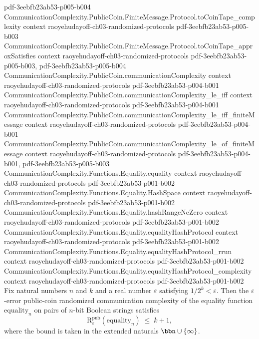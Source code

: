 \begin{theorem}
{    pdf-3eebfb23ab53-p005-b004}
\proofstep
  {CommunicationComplexity.PublicCoin.FiniteMessage.Protocol.toCoinTape_complexity}
  {context}
  {raoyehudayoff-ch03-randomized-protocols}
  {pdf-3eebfb23ab53-p005-b003}
\proofstep
  {CommunicationComplexity.PublicCoin.FiniteMessage.Protocol.toCoinTape_approxSatisfies}
  {context}
  {raoyehudayoff-ch03-randomized-protocols}
  {pdf-3eebfb23ab53-p005-b003,
    pdf-3eebfb23ab53-p005-b004}
\proofstep
  {CommunicationComplexity.PublicCoin.communicationComplexity}
  {context}
  {raoyehudayoff-ch03-randomized-protocols}
  {pdf-3eebfb23ab53-p004-b001}
\proofstep
  {CommunicationComplexity.PublicCoin.communicationComplexity_le_iff}
  {context}
  {raoyehudayoff-ch03-randomized-protocols}
  {pdf-3eebfb23ab53-p004-b001}
\proofstep
  {CommunicationComplexity.PublicCoin.communicationComplexity_le_iff_finiteMessage}
  {context}
  {raoyehudayoff-ch03-randomized-protocols}
  {pdf-3eebfb23ab53-p004-b001}
\proofstep
  {CommunicationComplexity.PublicCoin.communicationComplexity_le_of_finiteMessage}
  {context}
  {raoyehudayoff-ch03-randomized-protocols}
  {pdf-3eebfb23ab53-p004-b001,
    pdf-3eebfb23ab53-p005-b003}
\proofstep
  {CommunicationComplexity.Functions.Equality.equality}
  {context}
  {raoyehudayoff-ch03-randomized-protocols}
  {pdf-3eebfb23ab53-p001-b002}
\proofstep
  {CommunicationComplexity.Functions.Equality.HashSpace}
  {context}
  {raoyehudayoff-ch03-randomized-protocols}
  {pdf-3eebfb23ab53-p001-b002}
\proofstep
  {CommunicationComplexity.Functions.Equality.hashRangeNeZero}
  {context}
  {raoyehudayoff-ch03-randomized-protocols}
  {pdf-3eebfb23ab53-p001-b002}
\proofstep
  {CommunicationComplexity.Functions.Equality.equalityHashProtocol}
  {context}
  {raoyehudayoff-ch03-randomized-protocols}
  {pdf-3eebfb23ab53-p001-b002}
\proofstep
  {CommunicationComplexity.Functions.Equality.equalityHashProtocol_rrun}
  {context}
  {raoyehudayoff-ch03-randomized-protocols}
  {pdf-3eebfb23ab53-p001-b002}
\proofstep
  {CommunicationComplexity.Functions.Equality.equalityHashProtocol_complexity}
  {context}
  {raoyehudayoff-ch03-randomized-protocols}
  {pdf-3eebfb23ab53-p001-b002}
Fix natural numbers $n$ and $k$ and a real number $\varepsilon$ satisfying $1/2^{k} <
\varepsilon$. Then the $\varepsilon$-error public-coin randomized communication
complexity of the equality function $\mathrm{equality}_n$ on pairs of $n$-bit Boolean
strings satisfies
\[
  \mathrm{R}^{\mathrm{pub}}_{\varepsilon}(\mathrm{equality}_n) \;\le\; k + 1,
\]
where the bound is taken in the extended naturals $\bbn \cup \{\infty\}$.
\end{theorem}

